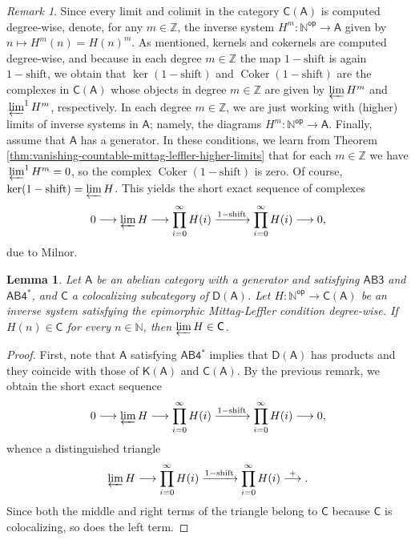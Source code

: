 \documentclass[reqno,11pt]{amsart}
\theoremstyle{plain}
\newtheorem{lem}[thm]{Lemma}
\theoremstyle{remark}
\newtheorem*{rem}{Remark}
\theoremstyle{definition}
\numberwithin{equation}{thm}
\newcommand{\SA}{\mathsf{A}}
\newcommand{\SC}{\mathsf{C}}
\newcommand{\CCC}{\boldsymbol{\mathsf{C}}}
\newcommand{\D}{\boldsymbol{\mathsf{D}}}
\newcommand{\K}{\boldsymbol{\mathsf{K}}}
\newcommand{\NN}{\mathbb{N}}
\newcommand{\ZZ}{\mathbb{Z}}
\newcommand{\lto}{\longrightarrow}
\DeclareMathOperator{\cok}{Coker}
\newcommand{\op}{\mathsf{op}}
\begin{document}
\begin{rem}
		Since every limit and colimit in the category $\CCC(\SA)$ is computed degree-wise,  denote, for any $m \in \ZZ$, the inverse system $H^m \colon \NN^\op \to \SA$ given by $n \mapsto H^m(n) = H(n)^m$. As mentioned, kernels and cokernels are computed degree-wise, and because in each degree $m \in \ZZ$ the map $1- \text{shift}$ is again $1 - \text{shift}$, we obtain that $\ker(1 - \text{shift})$ and $\cok(1 -  \text{shift})$ are the complexes in $\CCC(\SA)$ whose objects in degree $m \in \ZZ$ are given by $\varprojlim H^m$ and $\sideset{}{^{1}}\varprojlim H^m$, respectively. In each degree $m \in \ZZ$, we are just working with (higher) limits of inverse systems in $\SA$; namely, the diagrams $H^m \colon \NN^\op \to \SA$. Finally, assume that $\SA$ has a generator. In these conditions, we learn from Theorem \ref{thm:vanishing-countable-mittag-leffler-higher-limits} that for each $m \in \ZZ$ we have $\sideset{}{^{1}}\varprojlim H^m = 0$, so the complex $\cok(1 -  \text{shift})$ is zero. Of course, $\ker(1 - \text{shift}) = \varprojlim H$. This yields the short exact sequence	of complexes	
		\begin{equation}\label{short-exact-seq-milnor}
			0 \lto \varprojlim H \lto \prod_{i=0}^{\infty} H(i) \xrightarrow{1 - \text{shift}} \prod_{i=0}^{\infty} H(i) \lto 0,
		\end{equation}
		due to Milnor.
	\end{rem}
	
	\begin{lem}\label{lem:colocalzing-mittag-leffler-countable-system}
		Let $\SA$ be an abelian category with a generator and satisfying $\mathsf{AB3}$ and $\mathsf{AB4^*}$, and $\SC$ a colocalizing subcategory of $\D(\SA)$. Let $H \colon \NN^\op \to \CCC(\SA)$ be an inverse system satisfying the epimorphic Mittag-Leffler condition degree-wise. If $H(n) \in \SC$ for every $n \in \NN$, then $\varprojlim H \in \SC$.
	\end{lem}
	\begin{proof}
		First, note that $\SA$ satisfying $\mathsf{AB4^*}$ implies that $\D(\SA)$ has products and they coincide with those of $\K(\SA)$ and $\CCC(\SA)$. By the previous remark, we obtain the short exact sequence
		\[
			0 \lto \varprojlim H \lto \prod_{i=0}^{\infty} H(i) \xrightarrow{1 - \text{shift}} \prod_{i=0}^{\infty} H(i) \lto 0,
		\]
		whence a distinguished triangle
		\[
			\varprojlim H \lto \prod_{i=0}^{\infty} H(i) \xrightarrow{1 - \text{shift}} \prod_{i=0}^{\infty} H(i) \overset{+}{\lto}.
		\]
		Since both the middle and right terms of the triangle belong to $\SC$ because $\SC$ is colocalizing, so does the left term.
		
	\end{proof}
	
\end{document}
